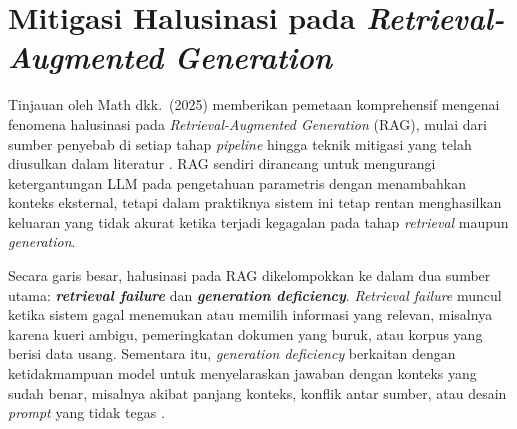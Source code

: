 



\section{Mitigasi Halusinasi pada \textit{Retrieval-Augmented Generation}}
\label{sec:mitigasi_halusinasi}

Tinjauan oleh Math dkk.\ (2025) memberikan pemetaan komprehensif mengenai fenomena halusinasi pada \textit{Retrieval-Augmented Generation} (RAG), mulai dari sumber penyebab di setiap tahap \textit{pipeline} hingga teknik mitigasi yang telah diusulkan dalam literatur \parencite{math2024hallucination}. RAG sendiri dirancang untuk mengurangi ketergantungan LLM pada pengetahuan parametris dengan menambahkan konteks eksternal, tetapi dalam praktiknya sistem ini tetap rentan menghasilkan keluaran yang tidak akurat ketika terjadi kegagalan pada tahap \textit{retrieval} maupun \textit{generation}.

Secara garis besar, halusinasi pada RAG dikelompokkan ke dalam dua sumber utama: \textbf{\textit{retrieval failure}} dan \textbf{\textit{generation deficiency}}. \textit{Retrieval failure} muncul ketika sistem gagal menemukan atau memilih informasi yang relevan, misalnya karena kueri ambigu, pemeringkatan dokumen yang buruk, atau korpus yang berisi data usang. Sementara itu, \textit{generation deficiency} berkaitan dengan ketidakmampuan model untuk menyelaraskan jawaban dengan konteks yang sudah benar, misalnya akibat panjang konteks, konflik antar sumber, atau desain \textit{prompt} yang tidak tegas \parencite{math2024hallucination}.

